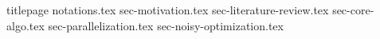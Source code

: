 \documentclass[a4paper, 10pt]{article}
\begin{document}


 \frenchspacing

{titlepage}
{notations.tex}
{sec-motivation.tex}
{sec-literature-review.tex}
{sec-core-algo.tex}
{sec-parallelization.tex}
{sec-noisy-optimization.tex}



% 


\clearpage


\begin{appendices}



\end{appendices}



\newpage




\begin{refcontext}
	\printbibliography[heading=bibintoc]
\end{refcontext}
\end{document}
